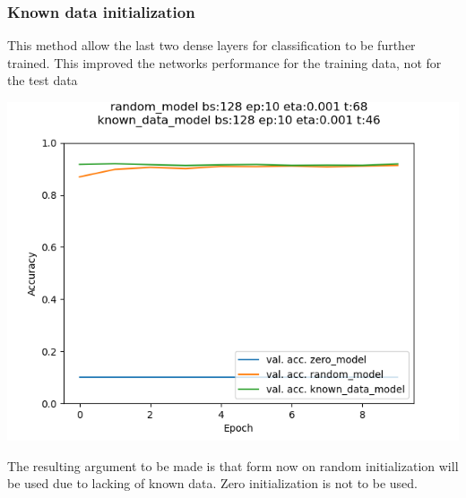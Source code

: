 \documentclass{article}
\newenvironment{Figure}
{\par\medskip\noindent\minipage{\linewidth}}
{\endminipage\par\medskip}
\begin{document}
\begin{multicols}{2}
\subsubsection{Known data initialization}
This method allow the last two dense layers for classification to be further trained. This improved the networks performance for the training data, not for the test data
\begin{Figure}
	\label{fig:known_init}
	\centering
	\includegraphics[width=\linewidth]{../img_1_1_init/acc_plot_init}
\end{Figure}

The resulting argument to be made is that form now on random initialization will be used due to lacking of known data. Zero initialization is not to be used.


\end{multicols}
\end{document}
